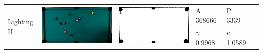 \begin{tabular}{|l|c|c|l|l|c|}
\multirow{2}{*}{Lighting II.} & \multirow{2}{*}{\includegraphics[scale=0.05]{../images/1/8_img.png}} & \multirow{2}{*}{\includegraphics[scale=0.05]{../images/1/8_mask.png}} & A = 368666 & P = 3339 & \multirow{2}{*}{}\\ 
& & & $\gamma$ = 0.9968 & $\kappa$ = 1.0589 & \\
\hline


\end{tabular}
